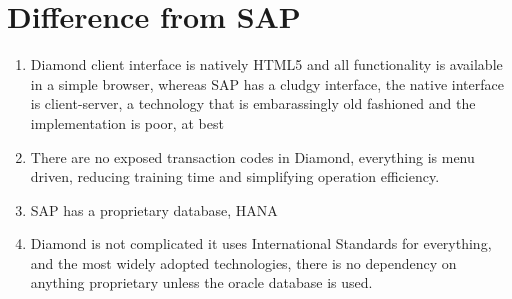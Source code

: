\documentclass[letterpaper,10pt,english]{sphinxmanual}
\begin{document}
\chapter{Difference from SAP}
\label{\detokenize{BusinessProcessReengineering:difference-from-sap}}\begin{enumerate}
%
\item {} 
Diamond client interface is natively HTML5 and all functionality is
available in a simple browser, whereas SAP has a cludgy interface,
the native interface is client-server, a technology that is
embarassingly old fashioned and the implementation is poor, at best

\item {} 
There are no exposed transaction codes in Diamond, everything is menu
driven, reducing training time and simplifying operation efficiency.

\item {} 
SAP has a proprietary database, HANA

\item {} 
Diamond is not complicated it uses International Standards for
everything, and the most widely adopted technologies, there is no
dependency on anything proprietary unless the oracle database is
used.

\end{enumerate}
\end{document}
